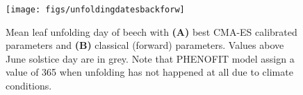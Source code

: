 \documentclass[11pt,]{article}
\begin{document}
\begin{figure}[H]

{\centering \texttt{[image: figs/unfoldingdatesbackforw]} 

}

\caption{Mean leaf unfolding day of beech with \textbf{(A)} best CMA-ES calibrated parameters and \textbf{(B)} classical (forward) parameters. Values above June solstice day are in grey. Note that PHENOFIT model assign a value of 365 when unfolding has not happened at all due to climate conditions.}\label{fig:unfoldingdatesbackforw}
\end{figure}





\newpage
\singlespacing
\printbibliography
\end{document}
